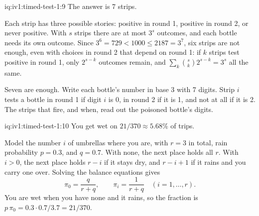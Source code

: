 \begin{solution}{iq:iv1:timed-test-1:9}
The answer is 7 strips.

Each strip has three possible stories: positive in round 1, positive in round 2, or never positive. With $s$ strips there are at most $3^s$ outcomes, and each bottle needs its own outcome. Since $3^6 = 729 < 1000 \le 2187 = 3^7$, six strips are not enough, even with choices in round 2 that depend on round 1: if $k$ strips test positive in round 1, only $2^{s-k}$ outcomes remain, and $\sum_k \binom{s}{k}2^{s-k} = 3^s$ all the same.

Seven are enough. Write each bottle's number in base 3 with 7 digits. Strip $i$ tests a bottle in round 1 if digit $i$ is 0, in round 2 if it is 1, and not at all if it is 2. The strips that fire, and when, read out the poisoned bottle's digits.

\end{solution}

\newpage
\begin{solution}{iq:iv1:timed-test-1:10}
You get wet on $21/370 \approx 5.68\%$ of trips.

Model the number $i$ of umbrellas where you are, with $r = 3$ in total, rain probability $p = 0.3$, and $q = 0.7$. With none, the next place holds all $r$. With $i > 0$, the next place holds $r - i$ if it stays dry, and $r - i + 1$ if it rains and you carry one over. Solving the balance equations gives
\[
\pi_0 = \frac{q}{r + q}, \qquad \pi_i = \frac{1}{r + q} \quad (i = 1, \dots, r).
\]
You are wet when you have none and it rains, so the fraction is $p\,\pi_0 = 0.3 \cdot 0.7/3.7 = 21/370$.

\end{solution}

